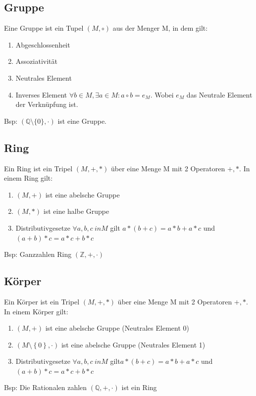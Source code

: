 \documentclass[10pt,a4paper]{article}
\begin{document}
\subsection{Gruppe}
Eine Gruppe ist ein Tupel $(M,\circ)$ aus der Menger M, in dem gilt:
\begin{enumerate}
\item Abgeschlossenheit
\item Assoziativität
\item Neutrales Element
\item Inverses Element\newline
$\forall b\in M, \exists a \in M : a \circ b = e_{M}$. Wobei $e_{M}$ das Neutrale Element der Verknüpfung ist.
\end{enumerate}
Bsp: $(\mathbb{Q} \setminus \{0\}, \cdot)$  ist eine Gruppe.
\newpage
\subsection{Ring}
Ein Ring ist ein Tripel $(M,+,*)$ über eine Menge M mit 2 Operatoren $+ , *$.
In einem Ring gilt:
\begin{enumerate}
\item $(M,+)$ ist eine abelsche Gruppe 
\item $(M,*)$ ist eine halbe Gruppe 
\item Distributivgesetze\newline
$\forall a,b,c \ in M $ gilt $ a*(b+c)=a*b+a*c $ und $ (a+b)*c =a*c+b*c $
\end{enumerate}
Bsp: Ganzzahlen Ring $ (\mathbb{Z},+,\cdot)$

\subsection{Körper}
Ein Körper ist ein Tripel $(M,+,*)$ über eine Menge M mit 2 Operatoren $+ , *$.
In einem Körper gilt: 
\begin{enumerate}
\item $(M,+)$ ist eine abelsche Gruppe (Neutrales Element 0)
\item $\left(M\setminus \left\{0\right\},\cdot \right)$ ist eine abelsche Gruppe (Neutrales Element 1)
\item Distributivgesetze \newline
$\forall a,b,c \ in M $ gilt\newline $ a*(b+c)=a*b+a*c $ und \newline$ (a+b)*c =a*c+b*c $
\end{enumerate}
Bsp: Die Rationalen zahlen $(\mathbb{Q},+,\cdot)$ ist ein Ring
\end{document}
